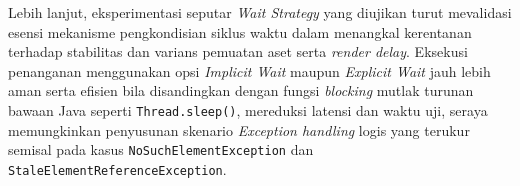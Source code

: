 \documentclass[a4paper,oneside,12pt]{report}
\renewcommand{\bibname}{Daftar Pustaka}
\begin{document}
Lebih lanjut, eksperimentasi seputar \textit{Wait Strategy} yang diujikan turut mevalidasi esensi mekanisme pengkondisian siklus waktu dalam menangkal kerentanan terhadap stabilitas dan varians pemuatan aset serta \textit{render delay}. Eksekusi penanganan menggunakan opsi \textit{Implicit Wait} maupun \textit{Explicit Wait} jauh lebih aman serta efisien bila disandingkan dengan fungsi \textit{blocking} mutlak turunan bawaan Java seperti \texttt{Thread.sleep()}, mereduksi latensi dan waktu uji, seraya memungkinkan penyusunan skenario \textit{Exception handling} logis yang terukur semisal pada kasus \texttt{NoSuchElementException} dan \texttt{StaleElementReferenceException}.


\end{document}
